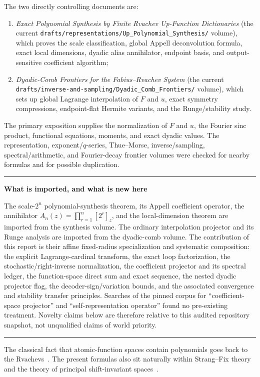 \documentclass[11pt,oneside]{article}
\numberwithin{equation}{section}
\theoremstyle{definition}
\theoremstyle{remark}
\newenvironment{statusbox}[1]{%
  \par\smallskip\noindent\begin{center}\begin{minipage}{0.94\textwidth}%
  \hrule\vspace{0.5em}\noindent\textbf{#1}\par\smallskip
}{%
  \vspace{0.5em}\hrule\end{minipage}\end{center}\smallskip
}
\begin{document}
The two directly controlling documents are:
\begin{enumerate}
\item \emph{Exact Polynomial Synthesis by Finite Rvachev Up-Function
Dictionaries} (the current
\nolinkurl{drafts/representations/Up_Polynomial_Synthesis/} volume), which
proves the scale classification, global Appell deconvolution formula, exact
local dimensions, dyadic alias annihilator, endpoint basis, and
output-sensitive coefficient algorithm;
\item \emph{Dyadic-Comb Frontiers for the Fabius--Rvachev System} (the current
\nolinkurl{drafts/inverse-and-sampling/Dyadic_Comb_Frontiers/} volume), which
sets up global Lagrange interpolation of $F$ and $u$, exact symmetry
compressions, endpoint-flat Hermite variants, and the Runge/stability study.
\end{enumerate}
The primary exposition supplies the normalization of $F$ and $u$, the
Fourier sinc product, functional equations, moments, and exact dyadic values.
The representation, exponent/$q$-series, Thue--Morse, inverse/sampling,
spectral/arithmetic, and Fourier-decay frontier volumes were checked for
nearby formulas and for possible duplication.

\begin{statusbox}{What is imported, and what is new here}
The scale-$2^n$ polynomial-synthesis theorem, its Appell coefficient
operator, the annihilator
$A_n(z)=\prod_{r=1}^{n}[2^r]_z$, and the local-dimension theorem are imported
from the synthesis volume.  The ordinary interpolation projector and its
Runge analysis are imported from the dyadic-comb volume.  The contribution
of this report is their affine fixed-radius specialization and systematic
composition: the explicit Lagrange-cardinal transform, the exact loop
factorization, the stochastic/right-inverse normalization, the coefficient
projector and its spectral ledger, the function-space direct sum and exact
sequence, the nested dyadic projector flag, the decoder-sign/variation
bounds, and the associated convergence and stability transfer principles.
Searches of the pinned corpus for ``coefficient-space projector'' and
``self-representation operator'' found no pre-existing treatment.  Novelty
claims below are therefore relative to this audited repository snapshot, not
unqualified claims of world priority.
\end{statusbox}

The classical fact that atomic-function spaces contain polynomials goes back
to the Rvachevs~\cite{RvachevRvachev1972,Rvachev1990}.  The present formulas
also sit naturally within Strang--Fix theory and the theory of principal
shift-invariant spaces~\cite{StrangFix1973,deBoorRon1992,deBoorDeVoreRon1994}.
\end{document}
